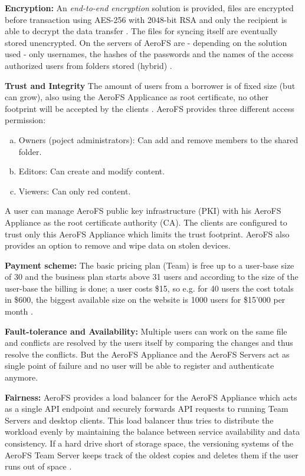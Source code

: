\textbf{Encryption:} An \textit{end-to-end encryption} solution is provided, files are encrypted before transaction using AES-256 with 2048-bit RSA and only the recipient is able to decrypt the data transfer \cite{aerofs:security}. The files for syncing itself are eventually stored unencrypted. On the servers of AeroFS are - depending on the solution used - only usernames, the hashes of the passwords and the names of the access authorized users from folders stored (hybrid) \cite{aerofs:security_2}.

\textbf{Trust and Integrity} The amount of users from a borrower is of fixed size (but can grow), also using the AeroFS Applicance as root certificate, no other footprint will be accepted by the clients \cite{aerofs:security}. AeroFS provides three different access permission:
\begin{enumerate}[(a)]
\item Owners (poject administrators): Can add and remove members to the shared folder.
\item Editors: Can create and modify content.
\item Viewers: Can only red content.
\end{enumerate}
A user can manage AeroFS  public key infrastructure (PKI) with his AeroFS Appliance as the root certificate authority (CA). The clients are configured to trust only this AeroFS Appliance which limits the trust footprint. AeroFS also provides an option to remove and wipe data on stolen devices.

\textbf{Payment scheme:} The basic pricing plan (Team) is free up to a user-base size of 30 \cite{aerofs:blog:30_users_free} and the business plan starts above 31 users and according to the size of the user-base the billing is done; a user costs \$15, so e.g. for 40 users the cost totals in \$600, the biggest available size on the website is 1000 users for \$15'000 per month \cite{aerofs:pricing}.

\textbf{Fault-tolerance and Availability:} Multiple users can work on the same file and conflicts are resolved by the users itself by comparing the changes and thus resolve the conflicts. But the AeroFS Appliance and the AeroFS Servers act as single point of failure and no user will be able to register and authenticate anymore.

\textbf{Fairness:} AeroFS provides a load balancer for the AeroFS Appliance which acts as a single API endpoint and securely forwards API requests to running Team Servers and desktop clients. This load balancer thus tries to distribute the workload evenly by maintaining the balance between service availability and data consistency.
If a hard drive short of storage space, the versioning systems of the AeroFS Team Server keeps track of the oldest copies and deletes them if the user runs out of space \cite{aerofs:USTO.RE}.


